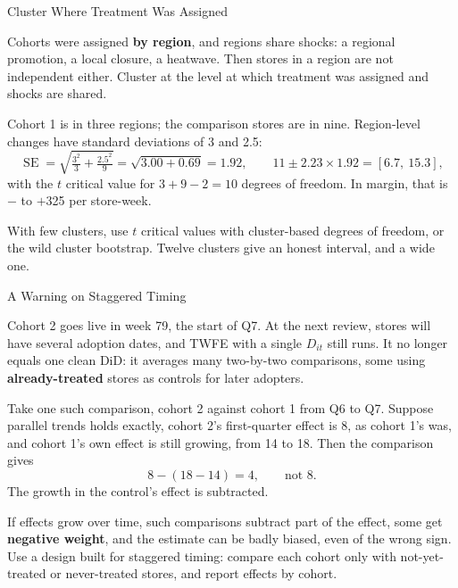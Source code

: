 \documentclass[aspectratio=169, 11pt, handout]{beamer}
\newcommand{\SE}{\operatorname{SE}}
\begin{document}
\begin{frame}{Cluster Where Treatment Was Assigned}

Cohorts were assigned \textbf{by region}, and regions share shocks: a regional promotion, a local closure, a heatwave. Then stores in a region are not independent either. Cluster at the level at which treatment was assigned and shocks are shared.

\bigskip

Cohort 1 is in three regions; the comparison stores are in nine. Region-level changes have standard deviations of 3 and 2.5:
\[
\SE = \sqrt{\tfrac{3^2}{3} + \tfrac{2.5^2}{9}} = \sqrt{3.00 + 0.69} = 1.92, \qquad 11 \pm 2.23 \times 1.92 = [6.7,\ 15.3],
\]
with the $t$ critical value for $3 + 9 - 2 = 10$ degrees of freedom. In margin, that is $-$ to $+$325 per store-week.

\bigskip

With few clusters, use $t$ critical values with cluster-based degrees of freedom, or the wild cluster bootstrap. Twelve clusters give an honest interval, and a wide one.
\end{frame}

\begin{frame}{A Warning on Staggered Timing}

Cohort 2 goes live in week 79, the start of Q7. At the next review, stores will have several adoption dates, and TWFE with a single $D_{it}$ still runs. It no longer equals one clean DiD: it averages many two-by-two comparisons, some using \textbf{already-treated} stores as controls for later adopters.

\bigskip

Take one such comparison, cohort 2 against cohort 1 from Q6 to Q7. Suppose parallel trends holds exactly, cohort 2's first-quarter effect is 8, as cohort 1's was, and cohort 1's own effect is still growing, from 14 to 18. Then the comparison gives
\[
8 - (18 - 14) = 4, \qquad \text{not } 8 .
\]
The growth in the control's effect is subtracted.

\bigskip

If effects grow over time, such comparisons subtract part of the effect, some get \textbf{negative weight}, and the estimate can be badly biased, even of the wrong sign. Use a design built for staggered timing: compare each cohort only with not-yet-treated or never-treated stores, and report effects by cohort.
\end{frame}
\end{document}
